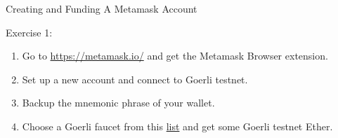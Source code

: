 \documentclass[handout]{beamer}
\begin{document}
\begin{frame}{Creating and Funding A Metamask Account}

	\begin{exercise}{Exercise 1:}
		\begin{enumerate}
			\item Go to \url{https://metamask.io/} and get the Metamask Browser extension.
			\item Set up a new account and connect to Goerli testnet.
			\item Backup the mnemonic phrase of your wallet.
			\item Choose a Goerli faucet from this \link \href{https://faucetlink.to/goerli}{list} and get some Goerli testnet Ether.
		\end{enumerate}
	\end{exercise}	
\end{frame}
\end{document}

